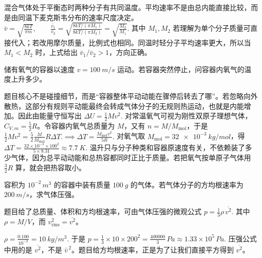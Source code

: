 \documentclass[lang=cn,11pt]{elegantbook}
\begin{document}
\begin{solution}
混合气体处于平衡态时两种分子有共同温度。平均速率不是由总内能直接比较，而是由同温下麦克斯韦分布的速率尺度决定。
 \(\bar v=\sqrt{\frac{8kT}{\pi m}},\qquad \frac{\bar v_1}{\bar v_2} =\sqrt{\frac{8kT/(\pi M_1)}{8kT/(\pi M_2)}} =\sqrt{\frac{M_2}{M_1}}.\) 
其中 \(M_1,M_2\) 若理解为单个分子质量可直接代入；若改用摩尔质量，比例式也相同。同温时轻分子平均速率更大，所以当 \(M_1<M_2\) 时，上式给出 \(\bar v_1/\bar v_2>1\)，方向正确。
\end{solution}

\begin{exercise}[容器骤停后温升为什么先看整体平动动能去哪了]
储有氧气的容器以速度 \(v=\SI{100}{m/s}\) 运动。若容器突然停止，问容器内氧气的温度上升多少。
\end{exercise}

\begin{solution}
题目核心不是碰撞细节，而是“容器整体平动动能在骤停后转去了哪”。若忽略向外散热，这部分有规则平动能最终会转成气体分子的无规则热运动，也就是内能增加。因此由能量守恒写出
 \(\Delta U=\frac12 Mv^2.\) 
对常温氧气可视为刚性双原子理想气体，\(C_{V,m}=\frac52R\)。令容器内氧气总质量为 \(M\)，又有 \(n=M/M_{\mathrm{mol}}\)，于是
 \(\frac12 Mv^2=\frac52 \frac{M}{M_{\mathrm{mol}}}R\Delta T. \implies \Delta T=\frac{M_{\mathrm{mol}}v^2}{5R}.\) 
对氧气取 \(M_{\mathrm{mol}}=\SI{32e-3}{kg/mol}\)，得
 \(\Delta T=\frac{32\times10^{-3}\times 100^2}{5\times 8.31}\approx \SI{7.7}{K}.\) 
温升只与分子种类和容器原速度有关，不依赖装了多少气体，因为总平动动能和总热容都同时正比于质量。若把氧气按单原子气体用 \(\frac32R\) 算，就会把热容取小。
\end{solution}

\begin{exercise}
容积为 \(10^{-2}\,\si{m^3}\) 的容器中装有质量 \(\SI{100}{g}\) 的气体。若气体分子的方均根速率为 \(\SI{200}{m/s}\)，求气体压强。
\end{exercise}

\begin{solution}
题目给了总质量、体积和方均根速率，可由气体压强的微观公式
 \(p=\frac13\rho\,\overline{v^2}.\) 
其中 \(\rho=M/V\)，而 \(v_{\mathrm{rms}}^2=\overline{v^2}\)。


 \(\rho=\frac{0.100}{10^{-2}}=\SI{10}{kg/m^3}.\) 
于是
 \(p=\frac13\times 10\times 200^2 =\frac{400000}{3}\,\si{Pa} \approx 1.33\times10^5\,\si{Pa}.\) 
压强公式中用的是 \(\overline{v^2}\)，不是 \(\bar v^{\,2}\)。题目给方均根速率，正是为了让我们直接平方得到 \(\overline{v^2}\)。
\end{solution}
\end{document}

